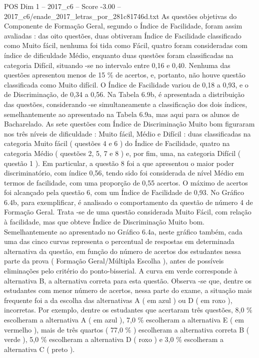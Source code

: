 \begin{textsample}{POS Dim 1 – 2017\_c6 – Score -3.00 – 2017\_c6/enade\_2017\_letras\_por\_281c81746d.txt}
As questões objetivas do Componente de Formação Geral, segundo o Índice de Facilidade, foram assim avaliadas : das oito questões, duas obtiveram Índice de Facilidade classificado como Muito fácil, nenhuma foi tida como Fácil, quatro foram consideradas com índice de dificuldade Médio, enquanto duas questões foram classificadas na categoria Difícil, situando -se no intervalo entre 0,16 e 0,40.
Nenhuma das questões apresentou menos de 15 \% de acertos, e, portanto, não houve questão classificada como Muito difícil.
O Índice de Facilidade variou de 0,18 a 0,93, e o de Discriminação, de 0,34 a 0,56.
Na Tabela 6.9b, é apresentada a distribuição das questões, considerando -se simultaneamente a classificação dos dois índices, semelhantemente ao apresentado na Tabela 6.9a, mas aqui para os alunos de Bacharelado.
As sete questões com Índice de Discriminação Muito bom figuraram nos três níveis de dificuldade : Muito fácil, Médio e Difícil : duas classificadas na categoria Muito fácil ( questões 4 e 6 ) do Índice de Facilidade, quatro na categoria Médio ( questões 2, 5, 7 e 8 ) e, por fim, uma, na categoria Difícil ( questão 1 ).
Em particular, a questão 8 foi a que apresentou o maior poder discriminatório, com índice 0,56, tendo sido foi considerada de nível Médio em termos de facilidade, com uma proporção de 0,55 acertos.
O máximo de acertos foi alcançado pela questão 6, com um Índice de Facilidade de 0,93.
No Gráfico 6.4b, para exemplificar, é analisado o comportamento da questão de número 4 de Formação Geral.
Trata -se de uma questão considerada Muito Fácil, com relação à facilidade, mas que obteve Índice de Discriminação Muito bom.
Semelhantemente ao apresentado no Gráfico 6.4a, neste gráfico também, cada uma das cinco curvas representa o percentual de respostas em determinada alternativa da questão, em função do número de acertos dos estudantes nessa parte da prova ( Formação Geral/Múltipla Escolha ), antes de possíveis eliminações pelo critério do ponto-bisserial.
A curva em verde corresponde à alternativa B, a alternativa correta para esta questão.
Observa -se que, dentre os estudantes com menor número de acertos, nessa parte do exame, a situação mais frequente foi a da escolha das alternativas A ( em azul ) ou D ( em roxo ), incorretas.
Por exemplo, dentre os estudantes que acertaram três questões, 8,0 \% escolheram a alternativa A ( em azul ), 7,0 \% escolheram a alternativa E ( em vermelho ), mais de três quartos ( 77,0 \% ) escolheram a alternativa correta B ( verde ), 5,0 \% escolheram a alternativa D ( roxo ) e 3,0 \% escolheram a alternativa C ( preto ).

\end{textsample}
